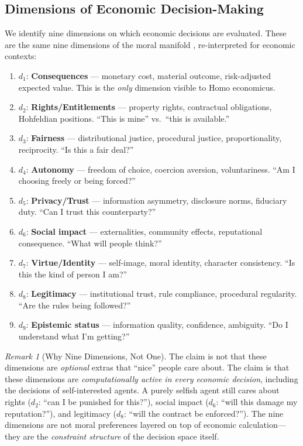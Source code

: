 \documentclass[12pt]{article}
\theoremstyle{definition}
\theoremstyle{remark}
\newtheorem{remark}[theorem]{Remark}
\begin{document}
\subsection{Dimensions of Economic Decision-Making}

We identify nine dimensions on which economic decisions are evaluated.  These are the same nine dimensions of the moral manifold \cite{bond2026geometric}, re-interpreted for economic contexts:

\begin{enumerate}
    \item $d_1$: \textbf{Consequences} --- monetary cost, material outcome, risk-adjusted expected value.  This is the \emph{only} dimension visible to Homo economicus.
    \item $d_2$: \textbf{Rights/Entitlements} --- property rights, contractual obligations, Hohfeldian positions.  ``This is mine'' vs.\ ``this is available.''
    \item $d_3$: \textbf{Fairness} --- distributional justice, procedural justice, proportionality, reciprocity.  ``Is this a fair deal?''
    \item $d_4$: \textbf{Autonomy} --- freedom of choice, coercion aversion, voluntariness.  ``Am I choosing freely or being forced?''
    \item $d_5$: \textbf{Privacy/Trust} --- information asymmetry, disclosure norms, fiduciary duty.  ``Can I trust this counterparty?''
    \item $d_6$: \textbf{Social impact} --- externalities, community effects, reputational consequence.  ``What will people think?''
    \item $d_7$: \textbf{Virtue/Identity} --- self-image, moral identity, character consistency.  ``Is this the kind of person I am?''
    \item $d_8$: \textbf{Legitimacy} --- institutional trust, rule compliance, procedural regularity.  ``Are the rules being followed?''
    \item $d_9$: \textbf{Epistemic status} --- information quality, confidence, ambiguity.  ``Do I understand what I'm getting?''
\end{enumerate}

\begin{remark}[Why Nine Dimensions, Not One]
The claim is not that these dimensions are \emph{optional} extras that ``nice'' people care about.  The claim is that these dimensions are \emph{computationally active in every economic decision}, including the decisions of self-interested agents.  A purely selfish agent still cares about rights ($d_2$: ``can I be punished for this?''), social impact ($d_6$: ``will this damage my reputation?''), and legitimacy ($d_8$: ``will the contract be enforced?'').  The nine dimensions are not moral preferences layered on top of economic calculation---they are the \emph{constraint structure} of the decision space itself.
\end{remark}
\end{document}
